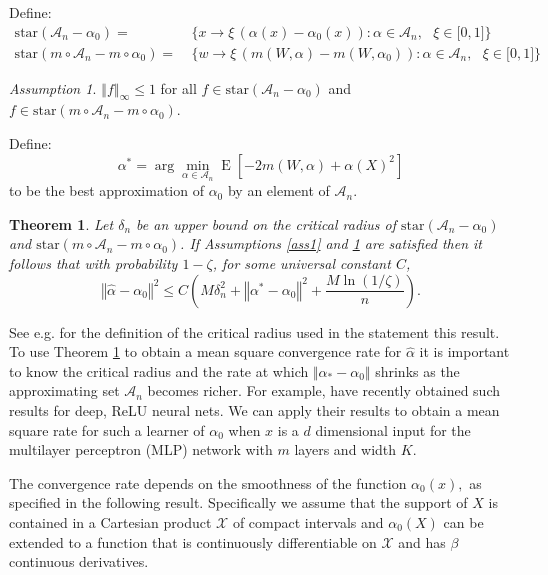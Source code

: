 \documentclass[aos]{imsart}
\numberwithin{equation}{section}
\theoremstyle{plain}
\newtheorem{theorem}{Theorem}[section]
\theoremstyle{remark}
\newtheorem{assumption}{Assumption}
\DeclareMathOperator{\E}{E}
\begin{document}
Define:
\begin{align*}
{\mathrm{star}}(\mathcal{A}_n-\alpha_{0})=~  &  \{x\rightarrow
\xi\,(\alpha(x)-\alpha_{0}(x)):\alpha%
\in\mathcal{A}_n,\text{ }\xi\in\lbrack0,1]\}\\
{\mathrm{star}}(m\circ\mathcal{A}_n-m\circ\alpha_{0})=~  &
\{w\rightarrow\xi\,(m(W,\alpha)-m(W,\alpha_{0}%
)):\alpha\in\mathcal{A}_n,\text{ }\xi\in\lbrack0,1]\}
\end{align*}

\begin{assumption}\label{ass2}
$\left\Vert f\right\Vert _{\infty}\leq1$ for all $f\in{\mathrm{star}}(\mathcal{A}_n-\alpha_{0})$ and $f\in {\mathrm{star}}(m\circ\mathcal{A}_n-m\circ\alpha_{0})$.
\end{assumption}

Define:
\[
\alpha^{\ast}=\arg\min_{\alpha\in\mathcal{A}_n}\E[-2m(W,\alpha)+\alpha(X)^{2}]
\]
to be the best approximation of $\alpha_{0}$ by an element of $\mathcal{A}_n$. 

\begin{theorem}\label{thm1}
Let $\delta_{n}$ be an upper bound on the critical radius of $\mathrm{star}(\mathcal{A}_n-\alpha_{0})$ and $\mathrm{star}(m\circ \mathcal{A}_n-m\circ\alpha_{0})$. If Assumptions \ref{ass1} and \ref{ass2} are
satisfied then it follows that with probability $1-\zeta$, for some universal constant $C$,
\[
\left\Vert \hat{\alpha}-\alpha_{0}\right\Vert ^{2}\leq C\left(M\delta_{n}%
^{2}+\left\Vert \alpha^{\ast}-\alpha_{0}\right\Vert ^{2}+\frac{M\ln(1/\zeta
)}{n}\right).
\]
\end{theorem}
See e.g. \cite{foster2019orthogonal} for the definition of the critical radius used in the statement this result.
To use Theorem \ref{thm1} to obtain a mean square convergence rate for $\hat{\alpha}$ it is important to know the critical radius and the rate at which $\Vert\alpha_{\ast}-\alpha_{0}\Vert$ shrinks as the approximating set $\mathcal{A}_n$ becomes richer. For example, \cite{farrell2021deep} have recently obtained such results for deep, ReLU neural nets. We can apply their results to obtain a mean square rate for such a learner of $\alpha_{0}$ when $x$ is a $d$ dimensional input for the multilayer perceptron (MLP) network with $m$ layers and width $K.$

The convergence rate depends on the smoothness of the function $\alpha_{0}(x),$ as specified in the following result. Specifically we assume that the support of $X$ is contained in a Cartesian product $\mathcal{X}$ of compact intervals and $\alpha_{0}(X)$ can be extended to a function that is continuously differentiable on $\mathcal{X}$ and has $\beta$ continuous derivatives.
\end{document}

